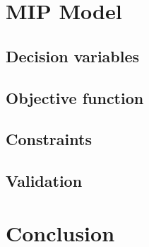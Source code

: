 \documentclass{article}
\begin{document}
\section{MIP Model}
\subsection{Decision variables}
\subsection{Objective function}
\subsection{Constraints}
\subsection{Validation}
\section{Conclusion}
\end{document}
